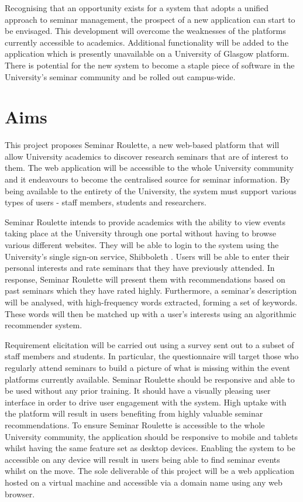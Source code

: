 \documentclass{l4proj}
\begin{document}
Recognising that an opportunity exists for a system that adopts a unified approach to seminar management, the prospect of a new application can start to be envisaged. This development will overcome the weaknesses of the platforms currently accessible to academics. Additional functionality will be added to the application which is presently unavailable on a University of Glasgow platform. There is potential for the new system to become a staple piece of software in the University's seminar community and be rolled out campus-wide. 

\section{Aims}
\label{sec:aims}

This project proposes Seminar Roulette, a new web-based platform that will allow University academics to discover research seminars that are of interest to them. The web application will be accessible to the whole University community and it endeavours to become the centralised source for seminar information. By being available to the entirety of the University, the system must support various types of users - staff members, students and researchers.

Seminar Roulette intends to provide academics with the ability to view events taking place at the University through one portal without having to browse various different websites. They will be able to login to the system using the University's single sign-on service, Shibboleth \citep{shibboleth}. Users will be able to enter their personal interests and rate seminars that they have previously attended. In response, Seminar Roulette will present them with recommendations based on past seminars which they have rated highly. Furthermore, a seminar's description will be analysed, with high-frequency words extracted, forming a set of keywords. These words will then be matched up with a user's interests using an algorithmic recommender system.

Requirement elicitation will be carried out using a survey sent out to a subset of staff members and students. In particular, the questionnaire will target those who regularly attend seminars to build a picture of what is missing within the event platforms currently available. Seminar Roulette should be responsive and able to be used without any prior training. It should have a visually pleasing user interface in order to drive user engagement with the system. High uptake with the platform will result in users benefiting from highly valuable seminar recommendations. To ensure Seminar Roulette is accessible to the whole University community, the application should be responsive to mobile and tablets whilst having the same feature set as desktop devices. Enabling the system to be accessible on any device will result in users being able to find seminar events whilst on the move. The sole deliverable of this project will be a web application hosted on a virtual machine and accessible via a domain name using any web browser.
\end{document}
